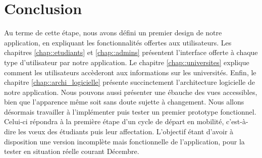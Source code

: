 \chapter*{Conclusion}

Au terme de cette étape, nous avons défini un premier design de notre application, en expliquant les fonctionnalités offertes aux utilisateurs. 
Les chapitres \ref{chap::etudiants} et \ref{chap::admins} présentent l'interface offerte à chaque type d'utilisateur par notre application. Le chapitre \ref{chap::universites} explique comment les utilisateurs accèderont aux informations sur les universités.
Enfin, le chapitre \ref{chap::archi_logicielle} présente succinctement l'architecture logicielle de notre application.
Nous pouvons aussi présenter une ébauche des vues accessibles, bien que l'apparence même soit sans doute sujette à changement.
\bigbreak
Nous allons désormais travailler à l'implémenter puis tester un premier prototype fonctionnel. Celui-ci répondra à la première étape d'un cycle de départ en mobilité, c'est-à-dire les vœux des étudiants puis leur affectation. L'objectif étant d'avoir à disposition une version incomplète mais fonctionnelle de l'application, pour la tester en situation réelle courant Décembre. 